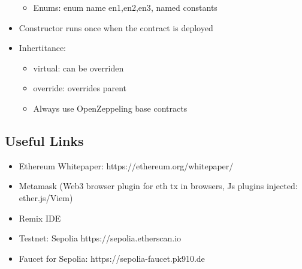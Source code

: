 \documentclass[../Main.tex]{subfiles}
\begin{document}
\begin{itemize}
\begin{itemize}
        \item Enums: enum name {en1,en2,en3}, named constants
    \end{itemize}
    \item Constructor runs once when the contract is deployed
    \item Inhertitance:
    \begin{itemize}
        \item virtual: can be overriden
        \item override: overrides parent
        \item Always use OpenZeppeling base contracts
    \end{itemize}
\end{itemize}

\subsection{Useful Links}
\begin{itemize}
    \item Ethereum Whitepaper: https://ethereum.org/whitepaper/
    \item Metamask (Web3 browser plugin for eth tx in browsers, Js plugins injected: ether.js/Viem)
    \item Remix IDE
    \item Testnet: Sepolia https://sepolia.etherscan.io
    \item Faucet for Sepolia: https://sepolia-faucet.pk910.de
\end{itemize}
\end{document}
